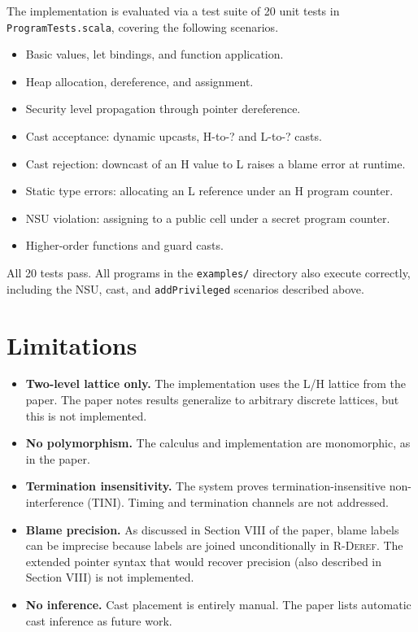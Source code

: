 \documentclass[11pt,a4paper]{article}
\begin{document}
The implementation is evaluated via a test suite of 20 unit tests in \texttt{ProgramTests.scala},
covering the following scenarios.

\begin{itemize}
  \item Basic values, let bindings, and function application.
  \item Heap allocation, dereference, and assignment.
  \item Security level propagation through pointer dereference.
  \item Cast acceptance: dynamic upcasts, H-to-? and L-to-? casts.
  \item Cast rejection: downcast of an H value to L raises a blame error at runtime.
  \item Static type errors: allocating an L reference under an H program counter.
  \item NSU violation: assigning to a public cell under a secret program counter.
  \item Higher-order functions and guard casts.
\end{itemize}

All 20 tests pass. All programs in the \texttt{examples/} directory also execute correctly,
including the NSU, cast, and \texttt{addPrivileged} scenarios described above.

\section{Limitations}

\begin{itemize}
  \item \textbf{Two-level lattice only.} The implementation uses the L/H lattice from the paper.
        The paper notes results generalize to arbitrary discrete lattices, but this is not implemented.
  \item \textbf{No polymorphism.} The calculus and implementation are monomorphic, as in the paper.
  \item \textbf{Termination insensitivity.} The system proves termination-insensitive
        non-interference (TINI). Timing and termination channels are not addressed.
  \item \textbf{Blame precision.} As discussed in Section VIII of the paper, blame labels
        can be imprecise because labels are joined unconditionally in \textsc{R-Deref}. The
        extended pointer syntax that would recover precision (also described in Section VIII)
        is not implemented.
  \item \textbf{No inference.} Cast placement is entirely manual. The paper lists automatic
        cast inference as future work.
\end{itemize}
\end{document}
